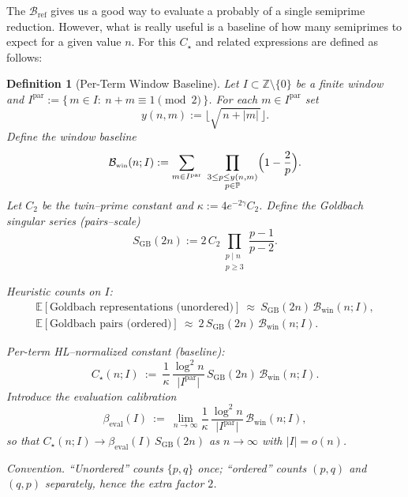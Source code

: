 \documentclass[11pt]{article}
\theoremstyle{inline}
\theoremstyle{break}
\theoremstyle{break}
\theoremstyle{break}
\theoremstyle{break}
\theoremstyle{break}
\theoremstyle{break}
\theoremstyle{break}
\newtheorem{definition}{Definition}
\theoremstyle{inline}
\newcommand{\twin}{{\scriptscriptstyle\mathrm{win}}}
\newcommand{\tref}{{\scriptscriptstyle\mathrm{ref}}}
\newcommand{\Bwin}{\mathcal{B}_\twin}
\newcommand{\Bref}{\mathcal{B}_\tref}
\newcommand{\betacal}{\beta_{\mathrm{eval}}}
\begin{document}
The \( \Bref \) gives us a good way to evaluate a probably of a single semiprime reduction.  However, what is really useful is a baseline of how many semiprimes to expect for a given value \( n \).  For this \( C_\star \) and related expressions are defined as follows:

\begin{definition}[Per-Term Window Baseline]\label{def:window-baseline}
Let \(I\subset\mathbb Z\setminus\{0\}\) be a finite window and
\(I^{\mathrm{par}}:=\{\,m\in I:\ n+m\equiv 1 \pmod 2\,\}\).
For each \(m\in I^{\mathrm{par}}\) set
\begin{equation}
y(n,m):=\bigl\lfloor\sqrt{\,n+|m|\,}\bigr\rfloor.
\end{equation}
Define the \emph{window baseline}
\begin{equation}
\Bwin(n;I):=\sum_{m\in I^{\mathrm{par}}}\ \prod_{\substack{3\le p\le y(n,m)\\ p\in\mathbb P}}
\Bigl(1-\frac{2}{p}\Bigr).
\end{equation}
Let \(C_2\) be the twin–prime constant and \(\kappa:=4e^{-2\gamma}C_2\).\cite{HardyLittlewood1923, MontgomeryVaughan2007}
Define the Goldbach singular series (pairs–scale)
\begin{equation}
S_{\mathrm{GB}}(2n):=2\,C_2\!\!\prod_{\substack{p\mid n\\ p\ge 3}}\frac{p-1}{p-2}.
\end{equation}

\emph{Heuristic counts on \(I\):}
\begin{equation}
\begin{aligned}
\mathbb{E}[\text{Goldbach representations (unordered)}]\ \approx\ S_{\mathrm{GB}}(2n)\,\Bwin(n;I), \\
\mathbb{E}[\text{Goldbach pairs (ordered)}]\ \approx\ 2\,S_{\mathrm{GB}}(2n)\,\Bwin(n;I).
\end{aligned}
\end{equation}

\emph{Per-term HL–normalized constant (baseline):}
\begin{equation}
C_\star(n;I)
\ :=\
\frac{1}{\kappa}\,\frac{\log^2 n}{\lvert I^{\mathrm{par}}\rvert}\,
S_{\mathrm{GB}}(2n)\,\Bwin(n;I).
\end{equation}
Introduce the evaluation calibration
\begin{equation}
\betacal(I)\ :=\ \lim_{n\to\infty}\frac{1}{\kappa}\,\frac{\log^2 n}{\lvert I^{\mathrm{par}}\rvert}\,\Bwin(n;I),
\end{equation}
so that \(C_\star(n;I)\to \betacal(I)\,S_{\mathrm{GB}}(2n)\) as \(n\to\infty\) with \(\lvert I\rvert=o(n)\).

\noindent\emph{Convention.} “Unordered” counts \(\{p,q\}\) once; “ordered” counts \((p,q)\) and \((q,p)\) separately, hence the extra factor \(2\).
\end{definition}
\end{document}
